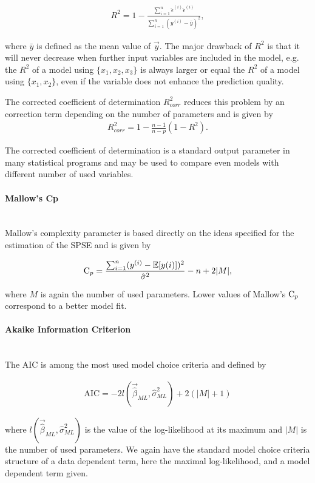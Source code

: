 \documentclass[10pt,a4paper]{report}
\newcommand{\subsubsubsection}[1]{\paragraph{#1}\mbox{}\\}
\begin{document}
\begin{align}
	R^2 = 1 - \frac{\sum_{i=1}^n \hat \epsilon^{(i)} \hat \epsilon^{(i)}}{\sum_{i=1}^n (y^{(i)} - \bar y)^2},
\end{align}

where $\bar y$ is defined as the mean value of $\vec{y}$. The major drawback of $R^2$ is that it will never decrease when further input variables are included in the model, e.g. the $R^2$ of a model using $\{x_1, x_2, x_3\}$ is always larger or equal the $R^2$ of a model using $\{x_1, x_2\}$, even if the variable does not enhance the prediction quality. 

The corrected coefficient of determination $R_{corr}^2$ reduces this problem by an correction term depending on the  number of parameters and is given by
\begin{align}
	R_{corr}^2 = 1 - \frac{n-1}{n-p}(1-R^2).
\end{align}

The corrected coefficient of determination is a standard output parameter in many statistical programs and may be used to compare even models with different number of used variables. \cite{fahrmeir2013regression}

\subsubsubsection{Mallow's Cp}

Mallow's complexity parameter is based directly on the ideas specified for the estimation of the SPSE and is given by

\begin{align}
	\text C_p = \frac{\sum_{i=1}^n (y^{(i)} - \mathbb{E}[y{(i)}])^2}{\hat \sigma^2} - n + 2 \vert M \vert,
\end{align}

where $M$ is again the number of used parameters. Lower values of Mallow's $\text C_p$ correspond to a better model fit. \cite{fahrmeir2013regression}

\subsubsubsection{Akaike Information Criterion}

The AIC is among the most used model choice criteria and defined by

\begin{align}
	\text{AIC} = -2 l(\vec{\hat{\beta}}_{ML}, \hat \sigma^2_{ML}) + 2(\vert M \vert +1)
\end{align}

where $l(\vec{\hat{\beta}}_{ML}, \hat \sigma^2_{ML})$ is the value of the log-likelihood at its maximum and $\vert M \vert$ is the number of used parameters. We again have the standard model choice criteria structure of a data dependent term, here the maximal log-likelihood, and a model dependent term given. 
\end{document}
